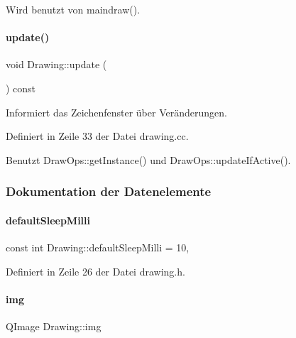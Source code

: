 Wird benutzt von maindraw().

\mbox{\label{classDrawing_a7c4c84c4956ff577d5032f0c4b2991bd}} 
\paragraph{\texorpdfstring{update()}{update()}}
{\footnotesize\ttfamily void Drawing\+::update (\begin{DoxyParamCaption}{ }\end{DoxyParamCaption}) const}



Informiert das Zeichenfenster über Veränderungen. 



Definiert in Zeile 33 der Datei drawing.\+cc.



Benutzt Draw\+Ops\+::get\+Instance() und Draw\+Ops\+::update\+If\+Active().



\subsubsection{Dokumentation der Datenelemente}
\mbox{\label{classDrawing_a208988699d8af4c3f53ebad688bc42bf}} 
\paragraph{\texorpdfstring{default\+Sleep\+Milli}{defaultSleepMilli}}
{\footnotesize\ttfamily const int Drawing\+::default\+Sleep\+Milli = 10\hspace{0.3cm}{\ttfamily [static]}, {\ttfamily [private]}}



Definiert in Zeile 26 der Datei drawing.\+h.

\mbox{\label{classDrawing_a8c2defb1fd8bab5ebc0b38da136f8e2b}} 
\paragraph{\texorpdfstring{img}{img}}
{\footnotesize\ttfamily Q\+Image Drawing\+::img\hspace{0.3cm}{\ttfamily [private]}}



